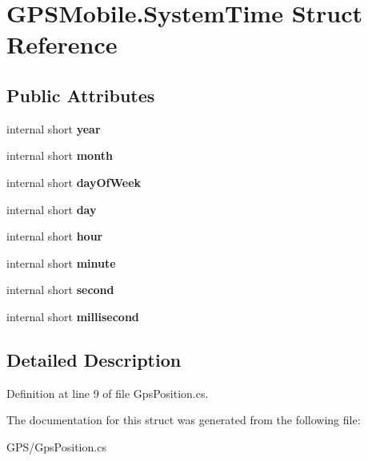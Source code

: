 \hypertarget{struct_g_p_s_mobile_1_1_system_time}{
\section{GPSMobile.SystemTime Struct Reference}
\label{struct_g_p_s_mobile_1_1_system_time}
}
\subsection*{Public Attributes}
\begin{DoxyCompactItemize}
\item 
\hypertarget{struct_g_p_s_mobile_1_1_system_time_adb3f1a6fcb28370a52112f03458bd210}{
internal short {\bfseries year}}
\label{struct_g_p_s_mobile_1_1_system_time_adb3f1a6fcb28370a52112f03458bd210}

\item 
\hypertarget{struct_g_p_s_mobile_1_1_system_time_aa52656a80b2fbe65db888828ef89fb5f}{
internal short {\bfseries month}}
\label{struct_g_p_s_mobile_1_1_system_time_aa52656a80b2fbe65db888828ef89fb5f}

\item 
\hypertarget{struct_g_p_s_mobile_1_1_system_time_a9f18680a273514bae5541324d3734ad8}{
internal short {\bfseries dayOfWeek}}
\label{struct_g_p_s_mobile_1_1_system_time_a9f18680a273514bae5541324d3734ad8}

\item 
\hypertarget{struct_g_p_s_mobile_1_1_system_time_aefdb5134cf460ac7a9f1046f8d03b59a}{
internal short {\bfseries day}}
\label{struct_g_p_s_mobile_1_1_system_time_aefdb5134cf460ac7a9f1046f8d03b59a}

\item 
\hypertarget{struct_g_p_s_mobile_1_1_system_time_a8178391898a5b70bda985950dfe72664}{
internal short {\bfseries hour}}
\label{struct_g_p_s_mobile_1_1_system_time_a8178391898a5b70bda985950dfe72664}

\item 
\hypertarget{struct_g_p_s_mobile_1_1_system_time_a48980be35d36702031525f85088e1ee9}{
internal short {\bfseries minute}}
\label{struct_g_p_s_mobile_1_1_system_time_a48980be35d36702031525f85088e1ee9}

\item 
\hypertarget{struct_g_p_s_mobile_1_1_system_time_ad7922b472e3aabba16246ff4ac6308b6}{
internal short {\bfseries second}}
\label{struct_g_p_s_mobile_1_1_system_time_ad7922b472e3aabba16246ff4ac6308b6}

\item 
\hypertarget{struct_g_p_s_mobile_1_1_system_time_a3ac1cd019a02aa62958d6c1d0cd656d7}{
internal short {\bfseries millisecond}}
\label{struct_g_p_s_mobile_1_1_system_time_a3ac1cd019a02aa62958d6c1d0cd656d7}

\end{DoxyCompactItemize}


\subsection{Detailed Description}


Definition at line 9 of file GpsPosition.cs.

The documentation for this struct was generated from the following file:\begin{DoxyCompactItemize}
\item 
GPS/GpsPosition.cs\end{DoxyCompactItemize}
